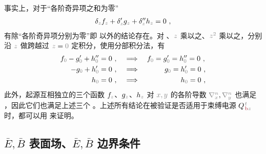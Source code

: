 事实上，对于“各阶奇异项之和为零”
\begin{align} \label{eq:deltasum=0}
	{\delta}_{\mathcolor{gray}{z}} f_{\mathcolor{gray}{z}} + {\delta}'_{\mathcolor{gray}{z}} g_{\mathcolor{gray}{z}} + 
	{\delta}''_{\mathcolor{gray}{z}} h_{\mathcolor{gray}{z}} = 0 ~,
\end{align}
有除“各阶奇异项分别为零”即  以外的结论存在。对 、$\mathcolor{gray}{z}$ 乘以之、$\mathcolor{gray}{z^2}$ 乘以之，分别沿 $\mathcolor{gray}{z}$ 做跨越过 $\mathcolor{gray}{z} = \mathcolor{gray}{0}$ 定积分，使用分部积分法，有
\begin{subequations} \label{eq:Intdeltasum=0}
\begin{align}
	f_{\mathcolor{gray}{0}} - g'_{\mathcolor{gray}{0}} + h''_{\mathcolor{gray}{0}} &= 0~, \hspace{1.2em} \Longrightarrow \hspace{1em} f_{\mathcolor{gray}{0}} = g'_{\mathcolor{gray}{0}} = h''_{\mathcolor{gray}{0}} = 0~, \label{eq:intdeltasum=0} \\
	- g_{\mathcolor{gray}{0}} + h'_{\mathcolor{gray}{0}} &= 0~, \hspace{1.2em} \Longrightarrow \hspace{1em} \hphantom{f_{\mathcolor{gray}{0}} =}~\;\! g_{\mathcolor{gray}{0}} = h'_{\mathcolor{gray}{0}} = 0~, \label{eq:intzdeltasum=0} \\
	h_{\mathcolor{gray}{0}} &= 0~, \hspace{1.2em} \Longrightarrow \hspace{1em} \hphantom{f_{\mathcolor{gray}{0}} = g_{\mathcolor{gray}{0}} =}~\;\! h_{\mathcolor{gray}{0}} = 0~, \label{eq:intzzdeltasum=0}
\end{align}
\end{subequations}
此外，起源互相独立的三个函数 $f_{\mathcolor{gray}{z}}$、$g_{\mathcolor{gray}{z}}$、$h_{\mathcolor{gray}{z}}$ 对 $\mathcolor{gray}{x,y}$ 的各阶导数 $\mathcolor{gray}{\nabla_x^n},\mathcolor{gray}{\nabla_y^n}$ 也满足 ，因此它们也满足上述三个 。上述所有结论在被验证是否适用于束缚电源 ${Q}^{\;\!\mathcolor{gray}{t}}_{\;\!\textcolor{Maroon}{\text{b}}\mathcolor{gray}{z}}$ 时，都可以用  来证明。

\subsection{$\bar{E},\bar{B}$ 表面场、$\bar{E},\bar{B}$ 边界条件}\label{ssec:EB-boundary}

